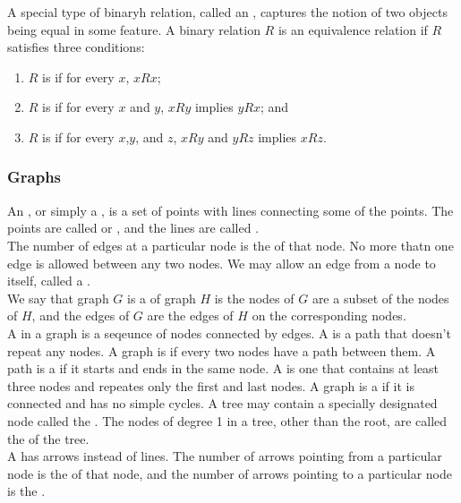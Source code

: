 \documentclass{article}
\begin{document}
A special type of binaryh relation, called an , captures the notion of two objects being equal in some feature. A binary relation $R$ is an equivalence relation if $R$ satisfies three conditions:

\begin{enumerate}
  \item $R$ is  if for every $x$, $xRx$;
  \item $R$ is  if for every $x$ and $y$, $xRy$ implies $yRx$; and 
  \item $R$ is  if for every $x$,$y$, and $z$, $xRy$ and $yRz$ implies $xRz$. 
\end{enumerate}

\subsubsection{Graphs}

An , or simply a , is a set of points with lines connecting some of the points. The points are called  or , and the lines are called . \\ 

The number of edges at a particular node is the  of that node. No more thatn one edge is allowed between any two nodes. We may allow an edge from a node to itself, called a . \\ 

We say that graph $G$ is a  of graph $H$ is the nodes of $G$ are a subset of the nodes of $H$, and the edges of $G$ are the edges of $H$ on the corresponding nodes. \\ 

A  in a graph is a seqeunce of nodes connected by edges. A  is a path that doesn't repeat any nodes. A graph is  if every two nodes have a path between them. A path is a  if it starts and ends in the same node. A  is one that contains at least three nodes and repeates only the first and last nodes. A graph is a  if it is connected and has no simple cycles. A tree may contain a specially designated node called the . The nodes of degree 1 in a tree, other than the root, are called the  of the tree. \\ 

A  has arrows instead of lines. The number of arrows pointing from a particular node is the  of that node, and the number of arrows pointing to a particular node is the . \\ 
\end{document}

